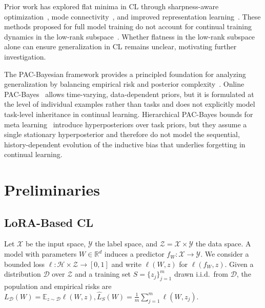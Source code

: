 \documentclass{article}
\newcommand{\minisection}[1]{\vspace{0.0in} \noindent {\bf #1}}
\theoremstyle{plain}
\theoremstyle{definition}
\theoremstyle{remark}
\begin{document}
\minisection{Flat Minima.}
Prior work has explored flat minima in CL through sharpness-aware optimization~\cite{pmlr-v151-bisla22a,Zhang_GAM,NEURIPS2024_C-Flat,yangRevisitingFlatnessAwareOptimization2025,chen2026sharpnessflatnessdecompositionframework}, mode connectivity~\cite{izmailov2019averagingweightsleadswider,mirzadeh2020linearmodeconnectivitymultitask}, and improved representation learning~\cite{hu2022doesselfsupervisedpretrainingperform,ramasesh2022effect}.
These methods proposed for full model training do not account for continual training dynamics in the low-rank subspace~\cite{yangRevisitingFlatnessAwareOptimization2025}. Whether flatness in the low-rank subspace alone can ensure generalization in CL remains unclear, motivating further investigation.


\minisection{PAC-Bayesian Theory.}
The PAC-Bayesian framework provides a principled foundation for analyzing generalization by balancing empirical risk and posterior complexity~\cite{mcallesterPACBayesianModelAveraging1999,mcallesterPACBayesianStochasticModel2003,pentinaPACBayesianBoundLifelong2014,germainPACBayesianTheoryMeets2016,lotfiPACBayesCompressionBounds2022}.
Online PAC-Bayes~\citep{NEURIPS2022_onlineBayes,NEURIPS2024_xinrui} allows time-varying, data-dependent priors, but it is formulated at the level of individual examples rather than tasks and does not explicitly model task-level inheritance in continual learning.
Hierarchical PAC-Bayes bounds for meta learning~\citep{pentinaPACBayesianBoundLifelong2014,JMLR:v24:22-1254} introduce hyperposteriors over task priors, but they assume a single stationary hyperposterior and therefore do not model the sequential, history-dependent evolution of the inductive bias that underlies forgetting in continual learning.

\section{Preliminaries}

\subsection{LoRA-Based CL}
\label{sec:pecl-setup}

Let $\mathcal X$ be the input space, $\mathcal Y$ the label space, and $\mathcal Z = \mathcal X \times \mathcal Y$ the data space.
A model with parameters $W \in \mathbb R^d$ induces a predictor $f_W : \mathcal X \to \mathcal Y$.
We consider a bounded loss $\ell : \mathcal H \times \mathcal Z \to [0,1]$ and write $\ell(W,z)$ for $\ell(f_W,z)$. 
Given a distribution $\mathcal D$ over $\mathcal Z$ and a training set $S=\{z_j\}_{j=1}^m$ drawn i.i.d.\ from $\mathcal D$, the population and empirical risks are
$
L_{\mathcal D}(W)
=
\mathbb E_{z\sim\mathcal D}\ell(W,z),
\hat L_{S}(W)
=
\frac{1}{m}\sum_{j=1}^{m}\ell(W,z_{j}).
$
\end{document}
